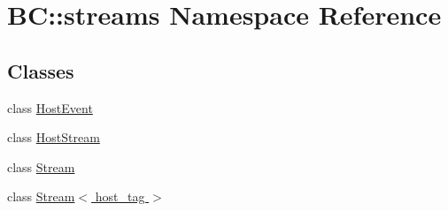 \hypertarget{namespaceBC_1_1streams}{}\section{BC\+:\+:streams Namespace Reference}
\label{namespaceBC_1_1streams}
\subsection*{Classes}
\begin{DoxyCompactItemize}
\item 
class \hyperlink{classBC_1_1streams_1_1HostEvent}{Host\+Event}
\item 
class \hyperlink{classBC_1_1streams_1_1HostStream}{Host\+Stream}
\item 
class \hyperlink{classBC_1_1streams_1_1Stream}{Stream}
\item 
class \hyperlink{classBC_1_1streams_1_1Stream_3_01host__tag_01_4}{Stream$<$ host\+\_\+tag $>$}
\end{DoxyCompactItemize}
